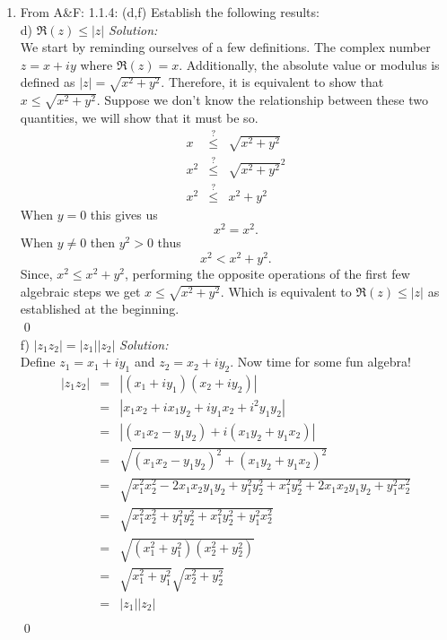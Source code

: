 \documentclass[10pt]{amsart}
\theoremstyle{nonumberplain}
\begin{document}
\begin{enumerate}[label={\bf {\arabic*}:}]
\item From A\&F: 1.1.4: (d,f)  Establish the following results:\\
d) $\Re(z) \leq |z|$ \textit{Solution:} \\
We start by reminding ourselves of a few definitions. The complex number $z = x +iy$ where $\Re(z) = x$.
Additionally, the absolute value or modulus is defined as $|z| = \sqrt{x^2 + y^2}$.
Therefore, it is equivalent to show that $x \leq \sqrt{x^2 + y^2}$.
Suppose we don't know the relationship between these two quantities, we will show that it must be so.
\begin{eqnarray*}
x &\stackrel{?}{\leq}& \sqrt{x^2 + y^2} \\
x^2 &\stackrel{?}{\leq}& \sqrt{x^2 + y^2}^2 \\
x^2 &\stackrel{?}{\leq}& x^2 + y^2
\end{eqnarray*}
When $y = 0$ this gives us
$$ x^2 = x^2. $$
When $y \neq 0$ then $y^2 > 0$ thus
$$ x^2 < x^2 + y^2.$$
Since, $x^2 \leq x^2 + y^2$, performing the opposite operations of the first few algebraic steps we get $x \leq \sqrt{x^2 + y^2}$.
Which is equivalent to $\Re(z) \leq |z|$ as established at the beginning. \\
\qed \\
f) $|z_1z_2| = |z_1||z_2|$ \textit{Solution:} \\
Define $z_1 = x_1 + iy_1$ and $z_2 = x_2 + iy_2$.
Now time for some fun algebra!
\begin{eqnarray*}
|z_1z_2| &=& |(x_1 + iy_1)(x_2 + iy_2)| \\
	      &=& |x_1x_2 + ix_1y_2 + iy_1x_2 + i^2y_1y_2| \\
	      &=& |(x_1x_2 - y_1y_2) + i(x_1y_2 + y_1x_2)| \\
	      &=& \sqrt{(x_1x_2 - y_1y_2)^2 + (x_1y_2 + y_1x_2)^2} \\
	      &=& \sqrt{x_1^2x_2^2 -2x_1x_2y_1y_2 + y_1^2y_2^2 + x_1^2y_2^2 + 2x_1x_2y_1y_2 + y_1^2x_2^2} \\
	      &=& \sqrt{x_1^2x_2^2  + y_1^2y_2^2 + x_1^2y_2^2 + y_1^2x_2^2} \\
	      &=& \sqrt{(x_1^2 + y_1^2)(x_2^2 + y_2^2)} \\
	      &=& \sqrt{x_1^2 + y_1^2}\sqrt{x_2^2 + y_2^2} \\
	      &=& |z_1||z_2| \\
\end{eqnarray*}
\qed \\


\end{enumerate}
\end{document}
